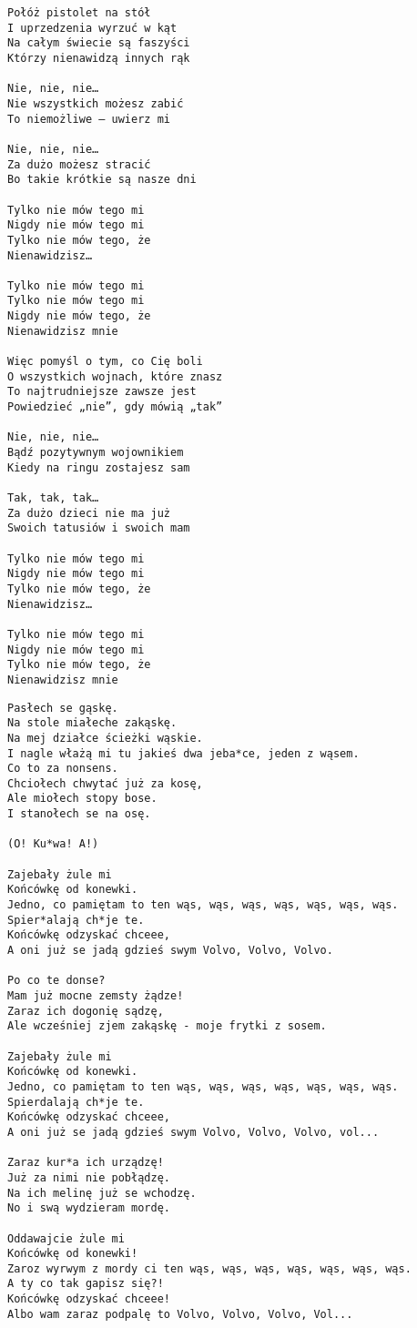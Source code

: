 \documentclass[12pt]{article}
\begin{document}
\begin{verbatim}
Połóż pistolet na stół
I uprzedzenia wyrzuć w kąt
Na całym świecie są faszyści
Którzy nienawidzą innych rąk

Nie, nie, nie…
Nie wszystkich możesz zabić
To niemożliwe – uwierz mi

Nie, nie, nie…
Za dużo możesz stracić
Bo takie krótkie są nasze dni

Tylko nie mów tego mi
Nigdy nie mów tego mi
Tylko nie mów tego, że
Nienawidzisz…

Tylko nie mów tego mi
Tylko nie mów tego mi
Nigdy nie mów tego, że
Nienawidzisz mnie

Więc pomyśl o tym, co Cię boli
O wszystkich wojnach, które znasz
To najtrudniejsze zawsze jest
Powiedzieć „nie”, gdy mówią „tak”

Nie, nie, nie…
Bądź pozytywnym wojownikiem
Kiedy na ringu zostajesz sam

Tak, tak, tak…
Za dużo dzieci nie ma już
Swoich tatusiów i swoich mam

Tylko nie mów tego mi
Nigdy nie mów tego mi
Tylko nie mów tego, że
Nienawidzisz…

Tylko nie mów tego mi
Nigdy nie mów tego mi
Tylko nie mów tego, że
Nienawidzisz mnie
\end{verbatim}
\clearpage

\begin{verbatim}
Pasłech se gąskę.
Na stole miałeche zakąskę.
Na mej działce ścieżki wąskie.
I nagle włażą mi tu jakieś dwa jeba*ce, jeden z wąsem.
Co to za nonsens.
Chciołech chwytać już za kosę,
Ale miołech stopy bose.
I stanołech se na osę.

(O! Ku*wa! A!)

Zajebały żule mi
Końcówkę od konewki.
Jedno, co pamiętam to ten wąs, wąs, wąs, wąs, wąs, wąs, wąs.
Spier*alają ch*je te.
Końcówkę odzyskać chceee,
A oni już se jadą gdzieś swym Volvo, Volvo, Volvo.

Po co te donse?
Mam już mocne zemsty żądze!
Zaraz ich dogonię sądzę,
Ale wcześniej zjem zakąskę - moje frytki z sosem.

Zajebały żule mi
Końcówkę od konewki.
Jedno, co pamiętam to ten wąs, wąs, wąs, wąs, wąs, wąs, wąs.
Spierdalają ch*je te.
Końcówkę odzyskać chceee,
A oni już se jadą gdzieś swym Volvo, Volvo, Volvo, vol...

Zaraz kur*a ich urządzę!
Już za nimi nie pobłądzę.
Na ich melinę już se wchodzę.
No i swą wydzieram mordę.

Oddawajcie żule mi
Końcówkę od konewki!
Zaroz wyrwym z mordy ci ten wąs, wąs, wąs, wąs, wąs, wąs, wąs.
A ty co tak gapisz się?!
Końcówkę odzyskać chceee!
Albo wam zaraz podpalę to Volvo, Volvo, Volvo, Vol...
\end{verbatim}
\clearpage
\end{document}
